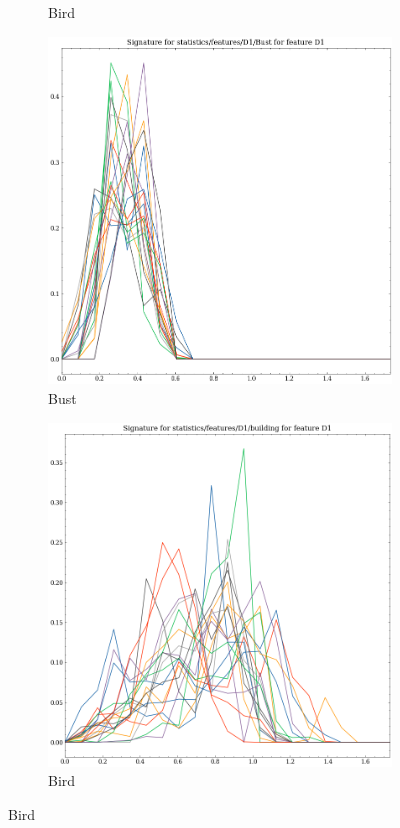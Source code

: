 \begin{figure}[t!p]
\begin{subfigure}[b]{0.23\textwidth}
        \caption{Bird}
        \label{fig:features-statistics-D1-f}    
    \end{subfigure}
    \hfill
    \begin{subfigure}[b]{0.23\textwidth}
        \includegraphics[width=\textwidth]{assets/feature_extraction/D1/Bust.png}
        \caption{Bust}
        \label{fig:features-statistics-D1-g}    
    \end{subfigure}
    \hfill
    \begin{subfigure}[b]{0.23\textwidth}
        \includegraphics[width=\textwidth]{assets/feature_extraction/D1/building.png}
        \caption{Bird}
        \label{fig:features-statistics-D1-h}    
    \end{subfigure}
    \hfill


\end{figure}
